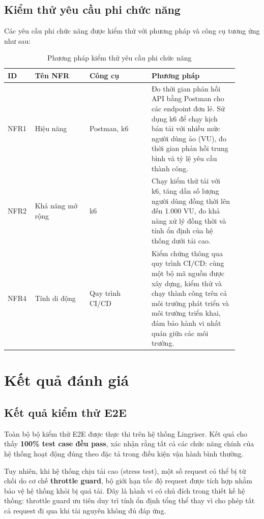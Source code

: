 \subsection{Kiểm thử yêu cầu phi chức năng}

Các yêu cầu phi chức năng được kiểm thử với phương pháp và công cụ tương ứng như sau:

\begin{table}[H]
\centering
\caption{Phương pháp kiểm thử yêu cầu phi chức năng}
\renewcommand{\arraystretch}{1.4}
\small
\begin{tabular}{|p{0.08\linewidth}|p{0.22\linewidth}|p{0.25\linewidth}|p{0.35\linewidth}|}
\hline
\textbf{ID} & \textbf{Tên NFR} & \textbf{Công cụ} & \textbf{Phương pháp} \\
\hline
NFR1 & Hiệu năng & Postman, k6 & Đo thời gian phản hồi API bằng Postman cho các endpoint đơn lẻ. Sử dụng k6 để chạy kịch bản tải với nhiều mức người dùng ảo (VU), đo thời gian phản hồi trung bình và tỷ lệ yêu cầu thành công. \\
\hline
NFR2 & Khả năng mở rộng & k6 & Chạy kiểm thử tải với k6, tăng dần số lượng người dùng đồng thời lên đến 1.000 VU, đo khả năng xử lý đồng thời và tính ổn định của hệ thống dưới tải cao. \\
\hline
NFR4 & Tính di động & Quy trình CI/CD & Kiểm chứng thông qua quy trình CI/CD: cùng một bộ mã nguồn được xây dựng, kiểm thử và chạy thành công trên cả môi trường phát triển và môi trường triển khai, đảm bảo hành vi nhất quán giữa các môi trường. \\
\hline
\end{tabular}
\end{table}

\section{Kết quả đánh giá}

\subsection{Kết quả kiểm thử E2E}

Toàn bộ bộ kiểm thử E2E được thực thi trên hệ thống Lingriser. Kết quả cho thấy \textbf{100\% test case đều pass}, xác nhận rằng tất cả các chức năng chính của hệ thống hoạt động đúng theo đặc tả trong điều kiện vận hành bình thường.

Tuy nhiên, khi hệ thống chịu tải cao (stress test), một số request có thể bị từ chối do cơ chế \textbf{throttle guard}, bộ giới hạn tốc độ request được tích hợp nhằm bảo vệ hệ thống khỏi bị quá tải. Đây là hành vi có chủ đích trong thiết kế hệ thống: throttle guard ưu tiên duy trì tính ổn định tổng thể thay vì cho phép tất cả request đi qua khi tài nguyên không đủ đáp ứng.


